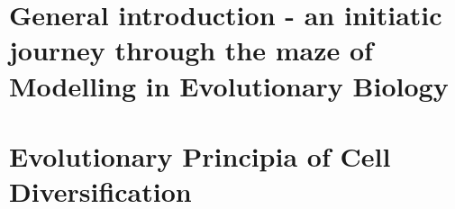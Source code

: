 \documentclass[11pt, 			%
               twoside,         %
			  ]{report}
\begin{document}






\setcounter{tocdepth}{3}
{
  \hypersetup{linkcolor=black}
  \tableofcontents
}




%


\chapter{General introduction - an initiatic journey through the maze of Modelling in Evolutionary Biology}



\chapter{Evolutionary Principia of Cell Diversification}



\end{document}
